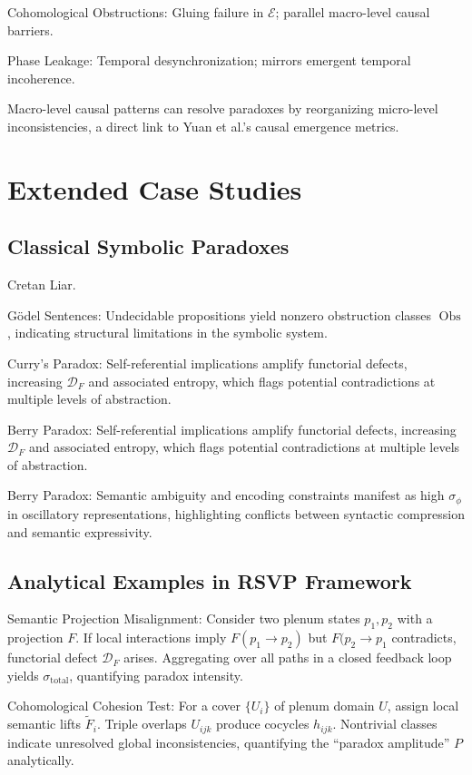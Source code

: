 \documentclass[12pt]{article}
\theoremstyle{plain}
\begin{document}
Cohomological Obstructions: Gluing failure in \(\mathcal{E}\); parallel macro-level causal barriers.

Phase Leakage: Temporal desynchronization; mirrors emergent temporal incoherence.

Macro-level causal patterns can resolve paradoxes by reorganizing micro-level inconsistencies, a direct link to Yuan et al.’s causal emergence metrics.

\section{Extended Case Studies}

\subsection{Classical Symbolic Paradoxes}

Cretan Liar.

Gödel Sentences: Undecidable propositions yield nonzero obstruction classes \(\operatorname{Obs}\), indicating structural limitations in the symbolic system.

Curry’s Paradox: Self-referential implications amplify functorial defects, increasing \(\mathcal{D}_F\) and associated entropy, which flags potential contradictions at multiple levels of abstraction.

Berry Paradox: Self-referential implications amplify functorial defects, increasing \(\mathcal{D}_F\) and associated entropy, which flags potential contradictions at multiple levels of abstraction.

Berry Paradox: Semantic ambiguity and encoding constraints manifest as high \(\sigma_\phi\) in oscillatory representations, highlighting conflicts between syntactic compression and semantic expressivity.

\subsection{Analytical Examples in RSVP Framework}

Semantic Projection Misalignment: Consider two plenum states \(p_1, p_2\) with a projection \(F\). If local interactions imply \(F(p_1 \to p_2)\) but \(F(p_2 \to p_1\) contradicts, functorial defect \(\mathcal{D}_F\) arises. Aggregating over all paths in a closed feedback loop yields \(\sigma_{\mathrm{total}}\), quantifying paradox intensity.

Cohomological Cohesion Test: For a cover \(\{U_i\}\) of plenum domain \(U\), assign local semantic lifts \(\widetilde{F}_i\). Triple overlaps \(U_{ijk}\) produce cocycles \(h_{ijk}\). Nontrivial classes indicate unresolved global inconsistencies, quantifying the “paradox amplitude” \(P\) analytically.
\end{document}
